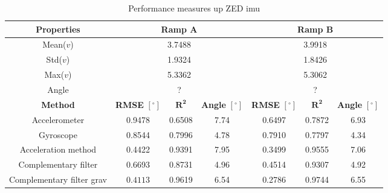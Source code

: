 \begin{table}[htbp]
	\centering
	\caption{Performance measures up ZED \gls{imu}}
	\label{tab:eval_table_imu_up}
	\begin{tabular}[t]{ccccccc}
		\toprule
		\textbf{Properties}       & \multicolumn{3}{c}{\textbf{Ramp A}} & \multicolumn{3}{c}{\textbf{Ramp B}}                                                                                                     \\
		\midrule
		Mean($v$)                 & \multicolumn{3}{c}{3.7488}          & \multicolumn{3}{c}{3.9918}                                                                                                              \\
		Std($v$)                  & \multicolumn{3}{c}{1.9324}          & \multicolumn{3}{c}{1.8426}                                                                                                              \\
		Max($v$)                  & \multicolumn{3}{c}{5.3362}          & \multicolumn{3}{c}{5.3062}                                                                                                              \\
		Angle                     & \multicolumn{3}{c}{?}               & \multicolumn{3}{c}{?}                                                                                                                   \\
		\hline
		\textbf{Method}           & \textbf{RMSE} $[^\circ]$            & $\mathbf{R^2}$                      & \textbf{Angle} $[^\circ]$ & \textbf{RMSE} $[^\circ]$ & $\mathbf{R^2}$ & \textbf{Angle} $[^\circ]$ \\
		\cmidrule(lr){2-4}   \cmidrule(lr){5-7}
		Accelerometer             & 0.9478                              & 0.6508                              & 7.74                      & 0.6497                   & 0.7872         & 6.93                      \\
		Gyroscope                 & 0.8544                              & 0.7996                              & 4.78                      & 0.7910                   & 0.7797         & 4.34                      \\
		Acceleration method       & 0.4422                              & 0.9391                              & 7.95                      & 0.3499                   & 0.9555         & 7.06                      \\
		Complementary filter      & 0.6693                              & 0.8731                              & 4.96                      & 0.4514                   & 0.9307         & 4.92                      \\
		Complementary filter grav & $\mathbf{0.4113}$                   & 0.9619                              & 6.54                      & 0.2786                   & 0.9744         & 6.55                      \\
		\bottomrule
	\end{tabular}
\end{table}
